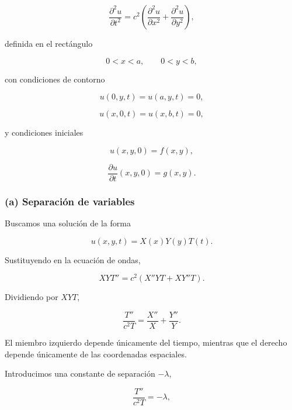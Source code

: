 \documentclass[12pt]{article}
\begin{document}
\begin{equation}
\frac{\partial^2u}{\partial t^2}
=
c^2
\left(
\frac{\partial^2u}{\partial x^2}
+
\frac{\partial^2u}{\partial y^2}
\right),
\end{equation}

definida en el rectángulo

\[
0<x<a,\qquad
0<y<b,
\]

con condiciones de contorno

\begin{equation}
u(0,y,t)=u(a,y,t)=0,
\end{equation}

\begin{equation}
u(x,0,t)=u(x,b,t)=0,
\end{equation}

y condiciones iniciales

\begin{equation}
u(x,y,0)=f(x,y),
\end{equation}

\begin{equation}
\frac{\partial u}{\partial t}(x,y,0)=g(x,y).
\end{equation}

\subsubsection*{(a) Separación de variables}

Buscamos una solución de la forma

\begin{equation}
u(x,y,t)=X(x)Y(y)T(t).
\end{equation}

Sustituyendo en la ecuación de ondas,

\[
XYT''
=
c^2
\left(
X''YT
+
XY''T
\right).
\]

Dividiendo por $XYT$,

\begin{equation}
\frac{T''}{c^2T}
=
\frac{X''}{X}
+
\frac{Y''}{Y}.
\end{equation}

El miembro izquierdo depende únicamente del tiempo, mientras que el derecho depende únicamente de las coordenadas espaciales.

Introducimos una constante de separación $-\lambda$,

\begin{equation}
\frac{T''}{c^2T}
=
-\lambda,
\end{equation}
\end{document}
